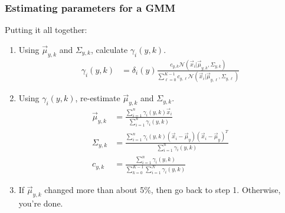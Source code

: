 \documentclass{beamer}
\begin{document}
\begin{frame}
  \frametitle{Estimating parameters for a GMM}
  
  Putting it all together:
  \begin{enumerate}
  \item
    Using $\vec\mu_{y,k}$ and $\Sigma_{y,k}$, calculate $\gamma_i(y,k)$.
    \begin{align*}
      \gamma_i(y,k)
      &=\delta_i(y)\frac{c_{y,k} {\mathcal N}(\vec{x}_i|\vec\mu_{y,k},\Sigma_{y,k})}{\sum_{\ell=0}^{K-1}c_{y,\ell} {\mathcal N}(\vec{x}_i|\vec\mu_{y,\ell},\Sigma_{y,\ell})}
    \end{align*}
  \item
    Using $\gamma_i(y,k)$, re-estimate $\vec\mu_{y,k}$ and $\Sigma_{y,k}$.
    \begin{align*}
      \vec\mu_{y,k} &=
      \frac{\sum_{i=1}^n \gamma_i(y,k) \vec{x}_i}{\sum_{i=1}^n\gamma_i(y,k)}\\
      \Sigma_{y,k} &=
      \frac{\sum_{i=1}^n \gamma_i(y,k) (\vec{x}_i-\vec\mu_y)(\vec{x}_i-\vec\mu_y)^T}{\sum_{i=1}^n\gamma_i(y,k)}\\
      c_{y,k} &= \frac{\sum_{i=1}^n \gamma_i(y,k)}{\sum_{k=0}^{K-1}\sum_{i=1}^N\gamma_i(y,k)}      
    \end{align*}
  \item
    If $\vec\mu_{y,k}$ changed more than about 5\%, then go back to
    step 1.  Otherwise, you're done.
  \end{enumerate}
\end{frame}
\end{document}
